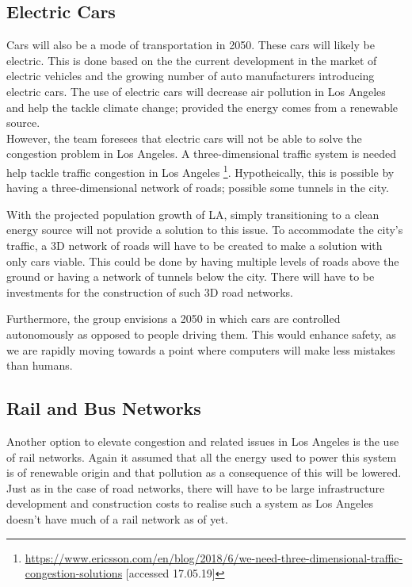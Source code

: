 \subsection{Electric Cars}
Cars will also be a mode of transportation in 2050. These cars will likely be electric. This is done based on the the current development in the market of electric vehicles and the growing number of auto manufacturers introducing electric cars. The use of electric cars will decrease air pollution in Los Angeles and help the tackle climate change; provided the energy comes from a renewable source. \\
However, the team foresees that electric cars will not be able to solve the congestion problem in Los Angeles. A three-dimensional traffic system is needed help tackle traffic congestion in Los Angeles \footnote{\url{https://www.ericsson.com/en/blog/2018/6/we-need-three-dimensional-traffic-congestion-solutions} [accessed 17.05.19]}. Hypotheically, this is possible by having a three-dimensional network of roads; possible some tunnels in the city.   




With the projected population growth of LA, simply transitioning to a clean energy source will not provide a solution to this issue. To accommodate the city's traffic, a 3D network of roads will have to be created to make a solution with only cars viable. This could be done by having multiple levels of roads above the ground or having a network of tunnels below the city. There will have to be investments for the construction of such 3D road networks. 

Furthermore, the group envisions a 2050 in which cars are controlled autonomously as opposed to people driving them. This would enhance safety, as we are rapidly moving towards a point where computers will make less mistakes than humans.

\subsection{Rail and Bus Networks}
Another option to elevate congestion and related issues in Los Angeles is the use of rail networks. Again it assumed that all the energy used to power this system is of renewable origin and that pollution as a consequence of this will be lowered. Just as in the case of road networks, there will have to be large infrastructure development and construction costs to realise such a system as Los Angeles doesn't have much of a rail network as of yet. 


